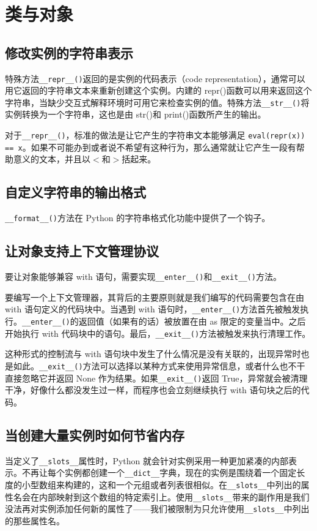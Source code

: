 \chapter{类与对象\label{Ch08}}
\section{修改实例的字符串表示}
特殊方法\verb|__repr__()|返回的是实例的代码表示（code representation），通常可以用它返回的字符串文本来重新创建这个实例。内建的 repr()函数可以用来返回这个字符串，当缺少交互式解释环境时可用它来检查实例的值。特殊方法\verb|__str__()|将实例转换为一个字符串，这也是由 str()和 print()函数所产生的输出。

对于\verb|__repr__()|，标准的做法是让它产生的字符串文本能够满足 \verb|eval(repr(x)) == x|。如果不可能办到或者说不希望有这种行为，那么通常就让它产生一段有帮助意义的文本，并且以$<$和$>$括起来。
\section{自定义字符串的输出格式}
\verb|__format__()|方法在 Python 的字符串格式化功能中提供了一个钩子。
\section{让对象支持上下文管理协议}
要让对象能够兼容 with 语句，需要实现\verb|__enter__()|和\verb|__exit__()|方法。

要编写一个上下文管理器，其背后的主要原则就是我们编写的代码需要包含在由 with 语句定义的代码块中。当遇到 with 语句时，\verb|__enter__()|方法首先被触发执行。\verb|__enter__()|的返回值（如果有的话）被放置在由 as 限定的变量当中。之后开始执行 with 代码块中的语句。最后，\verb|__exit__()|方法被触发来执行清理工作。

这种形式的控制流与 with 语句块中发生了什么情况是没有关联的，出现异常时也是如此。\verb|__exit__()|方法可以选择以某种方式来使用异常信息，或者什么也不干直接忽略它并返回 None 作为结果。如果\verb|__exit__()|返回 True，异常就会被清理干净，好像什么都没发生过一样，而程序也会立刻继续执行 with 语句块之后的代码。
\section{当创建大量实例时如何节省内存}
当定义了\verb|__slots__|属性时，Python 就会针对实例采用一种更加紧凑的内部表示。不再让每个实例都创建一个\verb|__dict__|字典，现在的实例是围绕着一个固定长度的小型数组来构建的，这和一个元组或者列表很相似。在\verb|__slots__|中列出的属性名会在内部映射到这个数组的特定索引上。使用\verb|__slots__|带来的副作用是我们没法再对实例添加任何新的属性了——我们被限制为只允许使用\verb|__slots__|中列出的那些属性名。


